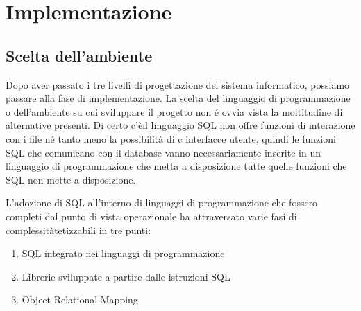\documentclass[12pt,a4paper,onecolumn,x11names]{article}
\begin{document}
\section{Implementazione}
	\subsection{Scelta dell'ambiente}
	\begin{flushleft}
		Dopo aver passato i tre livelli di progettazione del sistema informatico, possiamo passare alla fase di implementazione. La scelta del linguaggio di programmazione o dell'ambiente su cui sviluppare il progetto non \'{e} ovvia vista la moltitudine di alternative presenti. \newline
		Di certo c'èil linguaggio SQL non offre funzioni di interazione con i file n\'{e} tanto meno la possibilità di c interfacce utente, quindi le funzioni SQL che comunicano con il database vanno necessariamente inserite in un linguaggio di programmazione che metta a disposizione tutte quelle funzioni che SQL non mette a disposizione.\newline
		
		L'adozione di SQL all'interno di linguaggi di programmazione che fossero completi dal punto di vista operazionale ha attraversato varie fasi di complessitàtetizzabili in tre punti:
	\end{flushleft}
	\begin{enumerate}
		\item SQL integrato nei linguaggi di programmazione
		\item Librerie sviluppate a partire dalle istruzioni SQL
		\item Object Relational Mapping
	\end{enumerate}
\end{document}
